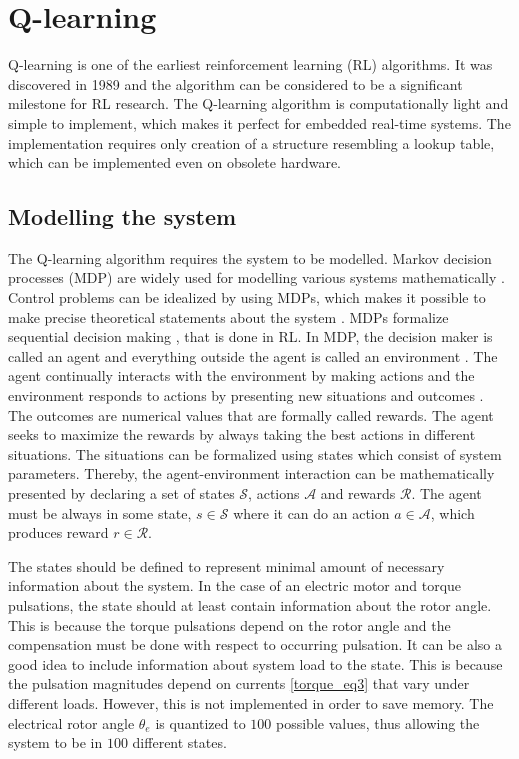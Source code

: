 \section{Q-learning}
Q-learning is one of the earliest reinforcement learning (RL) algorithms. It was discovered in 1989 \cite{RL:Watkins-Q} and the algorithm can be considered to be a significant milestone for RL research. The Q-learning algorithm is computationally light and simple to implement, which makes it perfect for embedded real-time systems. The implementation requires only creation of a structure resembling a lookup table, which can be implemented even on obsolete hardware.


\subsection{Modelling the system}
The Q-learning algorithm requires the system to be modelled. Markov decision processes (MDP) are widely used for modelling various systems mathematically \cite{RL:Single-step, RL:Sutton-Barto}. Control problems can be idealized by using MDPs, which makes it possible to make precise theoretical statements about the system \cite{RL:Sutton-Barto}. MDPs formalize sequential decision making \cite{RL:Sutton-Barto}, that is done in RL. In MDP, the decision maker is called an agent and everything outside the agent is called an environment \cite{RL:Sutton-Barto}. The agent continually interacts with the environment by making actions and the environment responds to actions by presenting new situations and outcomes \cite{RL:Sutton-Barto}. The outcomes are numerical values that are formally called rewards. The agent seeks to maximize the rewards by always taking the best actions in different situations. The situations can be formalized using states which consist of system parameters. Thereby, the agent-environment interaction can be mathematically presented by declaring a set of states $\mathcal{S}$, actions $\mathcal{A}$ and rewards $\mathcal{R}$. The agent must be always in some state, $s \in \mathcal{S}$ where it can do an action $a \in \mathcal{A}$, which produces reward $r \in \mathcal{R}$.

The states should be defined to represent minimal amount of necessary information about the system. In the case of an electric motor and torque pulsations, the state should at least contain information about the rotor angle. This is because the torque pulsations depend on the rotor angle and the compensation must be done with respect to occurring pulsation. It can be also a good idea to include information about system load to the state. This is because the pulsation magnitudes depend on currents \eqref{torque_eq3} that vary under different loads. However, this is not implemented in order to save memory. The electrical rotor angle $\theta_e$ is quantized to $100$ possible values, thus allowing the system to be in $100$ different states.

